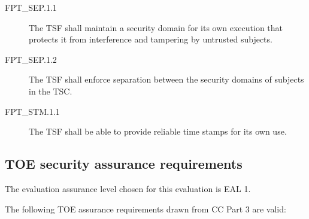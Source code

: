 \documentclass[12pt,english]{scrbook}
\begin{document}
\begin{description}

\item[FPT{\_}SEP.1.1 ]

The TSF shall maintain a security domain for its own execution that protects it
from interference and tampering by untrusted subjects.

\item[FPT{\_}SEP.1.2 ]

The TSF shall enforce separation between the security domains of subjects in
the TSC.

\end{description}





\begin{description}

\item[FPT{\_}STM.1.1]


The TSF shall be able to provide reliable time stamps for its own use.



\end{description}





\subsection{TOE security assurance requirements}

The evaluation assurance level chosen for this evaluation is EAL 1.

The following TOE assurance requirements drawn from CC Part 3 are valid:
\end{document}
